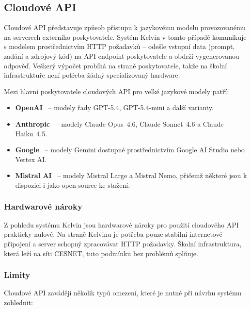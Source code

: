 \subsection{Cloudové API}
\label{subsec:deployment-cloud}

Cloudové API představuje způsob přístupu k jazykovému modelu provozovanému na serverech externího poskytovatele.
Systém Kelvin v tomto případě komunikuje s modelem prostřednictvím HTTP požadavků -- odešle vstupní data (prompt, zadání a zdrojový kód) na API endpoint poskytovatele a obdrží vygenerovanou odpověď.
Veškerý výpočet probíhá na straně poskytovatele, takže na školní infrastruktuře není potřeba žádný specializovaný hardware.

Mezi hlavní poskytovatele cloudových API pro velké jazykové modely patří:
\begin{itemize}
    \item \textbf{OpenAI}~\cite{openai_api} -- modely řady GPT-5.4, GPT-5.4-mini a další varianty.
    \item \textbf{Anthropic}~\cite{anthropic_api} -- modely Claude Opus~4.6, Claude Sonnet~4.6 a Claude Haiku~4.5.
    \item \textbf{Google}~\cite{google_vertex} -- modely Gemini dostupné prostřednictvím Google AI Studio nebo Vertex AI\@.
    \item \textbf{Mistral AI}~\cite{mistral_api} -- modely Mistral Large a Mistral Nemo, přičemž některé jsou k dispozici i jako open-source ke stažení.
\end{itemize}

\subsubsection*{Hardwarové nároky}
\label{subsubsec:deployment-cloud-hardware}

Z pohledu systému Kelvin jsou hardwarové nároky pro použití cloudového API prakticky nulové.
Na straně Kelvinu je potřeba pouze stabilní internetové připojení a server schopný zpracovávat HTTP požadavky.
Školní infrastruktura, která leží na síti CESNET, tuto podmínku bez problémů splňuje.

\subsubsection*{Limity}
\label{subsubsec:deployment-cloud-limits}

Cloudové API zavádějí několik typů omezení, které je nutné při návrhu systému zohlednit:

